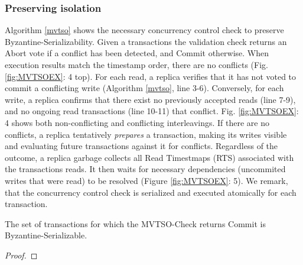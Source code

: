 
\subsubsection{Preserving isolation}

Algorithm \ref{mvtso} shows the necessary concurrency control check to preserve Byzantine-Serializability. 
Given a transactions  the validation check returns
an Abort vote if a conflict has been detected, and Commit
otherwise.  
When execution results match the timestamp order, there are no
conflicts (Fig. \ref{fig:MVTSOEX}: 4 top). For each read, a replica
verifies that it has not voted to commit a conflicting write
(Algorithm \ref{mvtso}, line 3-6). Conversely, for each write, a
replica confirms that there exist no previously accepted reads (line
7-9), and no ongoing read transactions
(line 10-11) that conflict. Fig. \ref{fig:MVTSOEX}: 4 shows both non-conflicting and conflicting interleavings.
If there are no conflicts, a replica tentatively \textit{prepares} a transaction, making its writes visible and evaluating future transactions against it for conflicts. Regardless of the outcome, a replica garbage collects all Read Timestmaps (RTS) associated with the transactions reads.
It then waits for necessary dependencies (uncommited writes that were read) to be resolved (Figure \ref{fig:MVTSOEX}: 5). We remark, that the concurrency control check is serialized and executed atomically for each transaction.

\begin{theorem}
The set of transactions for which the MVTSO-Check returns Commit is Byzantine-Serializable. 
\end{theorem}
\begin{proof}
\end{proof}

